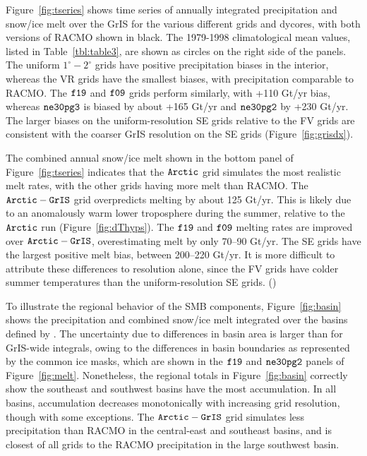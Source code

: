 \documentclass[draft]{agujournal2019}
\begin{document}
Figure~\ref{fig:tseries} shows time series of annually integrated precipitation and snow/ice melt over the GrIS for the various different grids and dycores, with both versions of RACMO shown in black. The 1979-1998 climatological mean values, listed in Table~\ref{tbl:table3}, are shown as circles on the right side of the panels. The uniform $1^{\circ}-2^{\circ}$ grids have positive precipitation biases in the interior, whereas the VR grids have the smallest biases, with precipitation comparable to RACMO. The $\tt f19$ and $\tt f09$ grids perform similarly, with +110 Gt/yr bias, whereas $\tt ne30pg3$ is biased by about +165 Gt/yr and $\tt ne30pg2$ by +230 Gt/yr. The larger biases on the uniform-resolution SE grids relative to the FV grids are consistent with the coarser GrIS resolution on the SE grids (Figure~\ref{fig:grisdx}).

The combined annual snow/ice melt shown in the bottom panel of Figure~\ref{fig:tseries} indicates that the $\tt Arctic$ grid simulates the most realistic melt rates, with the other grids having more melt than RACMO. The $\tt Arctic-GrIS$ grid overpredicts melting by about 125 Gt/yr. This is likely due to an anomalously warm lower troposphere during the summer, relative to the $\tt Arctic$ run (Figure~\ref{fig:dThyps}). The $\tt f19$ and $\tt f09$ melting rates are improved over $\tt Arctic-GrIS$, overestimating melt by only 70--90 Gt/yr. The SE grids have the largest positive melt bias, between 200--220 Gt/yr. It is more difficult to attribute these differences to resolution alone, since the FV grids have colder summer temperatures than the uniform-resolution SE grids. ({\color{blue}{Not sure I understand this sentence.  FV is both cooler and higher-resolution than SE, so one might suspect that cooler T is, in fact, connected to higher resolution.}})

To illustrate the regional behavior of the SMB components, Figure~\ref{fig:basin} shows the precipitation and combined snow/ice melt integrated over the basins defined by . The uncertainty due to differences in basin area is larger than for GrIS-wide integrals, owing to the differences in basin boundaries as represented by the common ice masks, which are shown in the $\tt f19$ and $\tt ne30pg2$ panels of Figure~\ref{fig:melt}. Nonetheless, the regional totals in Figure~\ref{fig:basin} correctly show the southeast and southwest basins have the most accumulation. In all basins, accumulation decreases monotonically with increasing grid resolution, though with some exceptions. The $\tt Arctic-GrIS$ grid simulates less precipitation than RACMO in the central-east and southeast basins, and is closest of all grids to the RACMO precipitation in the large southwest basin.
\end{document}
